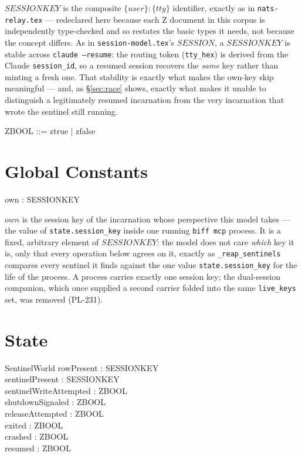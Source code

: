 \documentclass[a4paper,10pt,fleqn]{article}
\begin{document}
$SESSIONKEY$ is the composite $\{user\}:\{tty\}$ identifier, exactly as
in \texttt{nats-relay.tex} --- redeclared here because each Z document
in this corpus is independently type-checked and so restates the basic
types it needs, not because the concept differs.  As in
\texttt{session-model.tex}'s $SESSION$, a $SESSIONKEY$ is stable across
\texttt{claude --resume}: the routing token (\texttt{tty\_hex}) is
derived from the Claude \texttt{session\_id}, so a resumed session
recovers the \emph{same} key rather than minting a fresh one.  That
stability is exactly what makes the own-key skip meaningful --- and, as
\S\ref{sec:race} shows, exactly what makes it unable to distinguish a
legitimately resumed incarnation from the very incarnation that wrote
the sentinel still running.

\begin{zed}
  ZBOOL ::= ztrue | zfalse
\end{zed}

\section{Global Constants}
\label{sec:own}

\begin{axdef}
  own : SESSIONKEY
\end{axdef}

$own$ is the session key of the incarnation whose perspective this
model takes --- the value of \texttt{state.session\_key} inside one
running \texttt{biff mcp} process.  It is a fixed, arbitrary element of
$SESSIONKEY$: the model does not care \emph{which} key it is, only that
every operation below agrees on it, exactly as \texttt{\_reap\_sentinels}
compares every sentinel it finds against the one value
\texttt{state.session\_key} for the life of the process.  A process
carries exactly one session key; the dual-session companion, which once
supplied a second carrier folded into the same \texttt{live\_keys} set,
was removed (PL-231).

\section{State}

\begin{schema}{SentinelWorld}
  rowPresent : \power SESSIONKEY \\
  sentinelPresent : \power SESSIONKEY \\
  sentinelWriteAttempted : ZBOOL \\
  shutdownSignaled : ZBOOL \\
  releaseAttempted : ZBOOL \\
  exited : ZBOOL \\
  crashed : ZBOOL \\
  resumed : ZBOOL
\end{schema}
\end{document}
